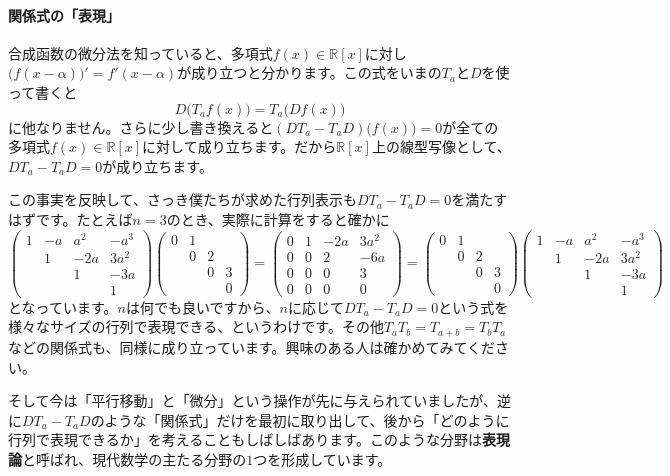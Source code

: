 \paragraph{関係式の「表現」} 合成函数の微分法を知っていると、多項式$f(x) \in \mathbb{R}[x]$に対し$\bigl(f(x - \alpha)\bigr)' = f'(x - \alpha)$が成り立つと分かります。この式をいまの$T_a$と$D$を使って書くと
\[
D\bigl(T_a f(x)\bigr) = T_a\bigl( Df(x) \bigr)
\]
に他なりません。さらに少し書き換えると$(D T_a - T_a D)\bigl(f(x)\bigr) = 0$が全ての多項式$f(x) \in \mathbb{R}[x]$に対して成り立ちます。だから$\mathbb{R}[x]$上の線型写像として、$D T_a - T_a D = 0$が成り立ちます。

この事実を反映して、さっき僕たちが求めた行列表示も$D T_a - T_a D = 0$を満たすはずです。たとえば$n = 3$のとき、実際に計算をすると確かに
\[
\begin{pmatrix}
1 & -a & a^2 & -a^3 \\
& 1 & -2a & 3a^2 \\
& & 1 & -3a \\
& & & 1
\end{pmatrix}
\begin{pmatrix}
0 & 1 \\
& 0 & 2 \\
& & 0 & 3 \\
& & & 0
\end{pmatrix}
=
\begin{pmatrix}
0 & 1 & -2a & 3a^2 \\
0 & 0 & 2 & -6a \\
0 & 0 & 0 & 3 \\
0 & 0 & 0 & 0
\end{pmatrix}
=
\begin{pmatrix}
0 & 1 \\
& 0 & 2 \\
& & 0 & 3 \\
& & & 0
\end{pmatrix}
\begin{pmatrix}
1 & -a & a^2 & -a^3 \\
& 1 & -2a & 3a^2 \\
& & 1 & -3a \\
& & & 1
\end{pmatrix}
\]
となっています。$n$は何でも良いですから、$n$に応じて$D T_a - T_a D = 0$という式を様々なサイズの行列で表現できる、というわけです。その他$T_a T_b = T_{a + b} = T_b T_a$などの関係式も、同様に成り立っています。興味のある人は確かめてみてください。

そして今は「平行移動」と「微分」という操作が先に与えられていましたが、逆に$D T_a - T_a D$のような「関係式」だけを最初に取り出して、後から「どのように行列で表現できるか」を考えることもしばしばあります。このような分野は\textbf{表現論}と呼ばれ、現代数学の主たる分野の$1$つを形成しています。

